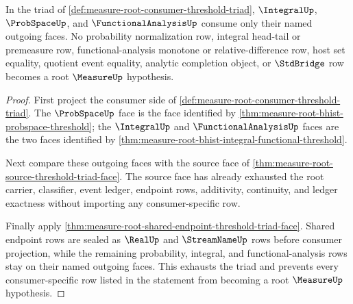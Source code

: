 \begin{theorem}
\label{thm:measure-root-consumer-threshold-triad-exhaustion}
In the triad of \autoref{def:measure-root-consumer-threshold-triad},
$\IntegralUp$, $\ProbSpaceUp$, and $\FunctionalAnalysisUp$ consume only their
named outgoing faces. No probability normalization row, integral head-tail or
premeasure row, functional-analysis monotone or relative-difference row, host
set equality, quotient event equality, analytic completion object, or
$\StdBridge$ row becomes a root $\MeasureUp$ hypothesis.
\end{theorem}
\begin{proof}
First project the consumer side of
\autoref{def:measure-root-consumer-threshold-triad}. The $\ProbSpaceUp$ face
is the face identified by
\autoref{thm:measure-root-bhist-probspace-threshold}; the $\IntegralUp$ and
$\FunctionalAnalysisUp$ faces are the two faces identified by
\autoref{thm:measure-root-bhist-integral-functional-threshold}.

Next compare these outgoing faces with the source face of
\autoref{thm:measure-root-source-threshold-triad-face}. The source face has
already exhausted the root carrier, classifier, event ledger, endpoint rows,
additivity, continuity, and ledger exactness without importing any
consumer-specific row.

Finally apply
\autoref{thm:measure-root-shared-endpoint-threshold-triad-face}. Shared
endpoint rows are sealed as $\RealUp$ and $\StreamNameUp$ rows before consumer
projection, while the remaining probability, integral, and
functional-analysis rows stay on their named outgoing faces. This exhausts
the triad and prevents every consumer-specific row listed in the statement
from becoming a root $\MeasureUp$ hypothesis.
\end{proof}
